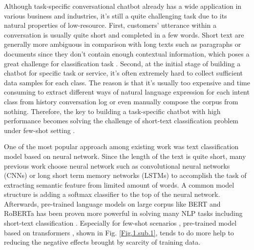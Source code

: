 \documentclass[letterpaper]{article} %
\begin{document}
  Although  task-specific  conversational chatbot already has a wide application
  in various business and industries, it's still a quite challenging task due to
  its  natural  properties of low-resource. First, customers' utterance within a
  conversation  is  usually  quite  short  and  completed  in a few words. Short
  text \cite{song2014short}  are generally more ambiguous in comparison with long
  texts  such  as  paragraphs  or  documents  since  they  don't  contain enough
  contextual  information,  which poses a great challenge \cite{chen2019deep} for
  classification        task \cite{phan2008learning,yan2009dynamic,hua2015short}.
  Second,  at  the  initial  stage  of  building  a chatbot for specific task or
  service, it's often extremely hard to collect sufficient data samples for each
  class.  The  reason  is  that it's usually too expensive and time consuming to
  extract  different  ways  of natural language expression for each intent class
  from  history  conversation  log  or  even  manually  compose  the corpus from
  nothing.  Therefore,  the  key  to  building a task-specific chatbot with high
  performance     becomes     solving     the     challenge     of    short-text
  classification \cite{sriram2010short}        problem       under       few-shot
  setting \cite{yu2018diverse}.

  One  of  the most popular approach among existing work was text classification
  model  based  on  neural network. Since the length of the text is quite short,
  many   previous   work \cite{wen2016network}  choose  neural  network  such  as
  convolutional                          neural                         networks
  (CNNs) \cite{kim2014convolutional,zhang2015character,conneau2016very}  or  long
  short  term memory networks (LSTMs) \cite{mousa2017contextual,liu2016recurrent}
  to  accomplish  the task of extracting semantic feature from limited amount of
  words.  A  common model structure is adding a softmax classifier to the top of
  the  neural  network.  Afterwards, pre-trained language models on large corpus
  like   BERT \cite{devlin2018bert}  and  RoBERTa \cite{liu2019roberta}  has  been
  proven   more   powerful  in  solving  many  NLP  tasks  including  short-text
  classification \cite{madabushi2020cost}.      Especially      for      few-shot
  scenarios \cite{yu2018diverse},       pre-trained      model      based      on
  transformers \cite{vaswani2017attention},   shown  in  Fig.  \ref{Fig.1.sub.1},
  tends  to do more help to reducing the negative effects brought by scarcity of
  training data.
\end{document}
